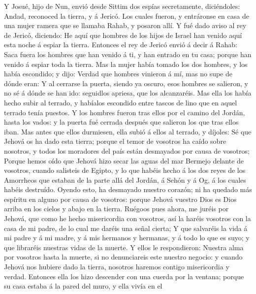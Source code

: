 Y Josué, hijo de Nun, envió desde Sittim dos espías
secretamente, diciéndoles: Andad, reconoced la tierra, y á Jericó. Los
cuales fueron, y entráronse en casa de una mujer ramera que se llamaba
Rahab, y posaron allí.  Y fué dado aviso al rey de Jericó,
diciendo: He aquí que hombres de los hijos de Israel han venido aquí
esta noche á espiar la tierra.  Entonces el rey de Jericó
envió á decir á Rahab: Saca fuera los hombres que han venido á ti, y han
entrado en tu casa; porque han venido á espiar toda la tierra.
 Mas la mujer había tomado los dos hombres, y los había
escondido; y dijo: Verdad que hombres vinieron á mí, mas no supe de
dónde eran:  Y al cerrarse la puerta, siendo ya oscuro,
esos hombres se salieron, y no sé á dónde se han ido: seguidlos apriesa,
que los alcanzaréis.  Mas ella los había hecho subir al
terrado, y habíalos escondido entre tascos de lino que en aquel terrado
tenía puestos.  Y los hombres fueron tras ellos por el
camino del Jordán, hasta los vados: y la puerta fué cerrada después que
salieron los que tras ellos iban.  Mas antes que ellos
durmiesen, ella subió á ellos al terrado, y díjoles:  Sé
que Jehová os ha dado esta tierra; porque el temor de vosotros ha caído
sobre nosotros, y todos los moradores del país están desmayados por
causa de vosotros;  Porque hemos oído que Jehová hizo
secar las aguas del mar Bermejo delante de vosotros, cuando salisteis de
Egipto, y lo que habéis hecho á los dos reyes de los Amorrheos que
estaban de la parte allá del Jordán, á Sehón y á Og, á los cuales habéis
destruído.  Oyendo esto, ha desmayado nuestro corazón; ni
ha quedado más espíritu en alguno por causa de vosotros: porque Jehová
vuestro Dios es Dios arriba en los cielos y abajo en la tierra.
 Ruégoos pues ahora, me juréis por Jehová, que como he
hecho misericordia con vosotros, así la haréis vosotros con la casa de
mi padre, de lo cual me daréis una señal cierta;  Y que
salvaréis la vida á mi padre y á mi madre, y á mis hermanos y hermanas,
y á todo lo que es suyo; y que libraréis nuestras vidas de la muerte.
 Y ellos le respondieron: Nuestra alma por vosotros hasta
la muerte, si no denunciareis este nuestro negocio: y cuando Jehová nos
hubiere dado la tierra, nosotros haremos contigo misericordia y verdad.
 Entonces ella los hizo descender con una cuerda por la
ventana; porque su casa estaba á la pared del muro, y ella vivía en el
